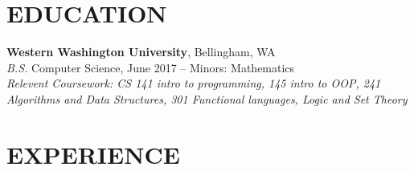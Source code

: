 \documentclass[line,margin]{res}
\begin{document}
\address{360.931.3237 $|$ rainierharvey@gmail.com $|$ https://rainierharvey.me $|$ github.com/euranium}

\begin{resume}
 
\section{EDUCATION}
	{\bf Western Washington University}, Bellingham, WA \\
	{\sl B.S.} Computer Science, {\small June 2017} -- Minors: Mathematics \\
	{\sl Relevent Coursework: CS 141 {\small intro to programming}, 145 {\small intro to OOP}, 241 {\small Algorithms and Data Structures}, 
	301 {\small Functional languages, Logic and Set Theory}}

\section{EXPERIENCE}


\end{resume}
\end{document}
